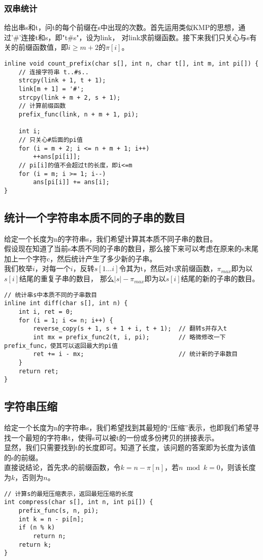         \subsubsection{双串统计}
            给出串s和t，问t的每个前缀在s中出现的次数。首先运用类似KMP的思想，通过'\#'连接t和s，即"t\#s"，设为link，
            对link求前缀函数。接下来我们只关心与s有关的前缀函数值，即$i \ge m+2$的$\pi[i]$。
            \begin{lstlisting}
inline void count_prefix(char s[], int n, char t[], int m, int pi[]) {
    // 连接字符串 t..#s..
    strcpy(link + 1, t + 1);
    link[m + 1] = '#';
    strcpy(link + m + 2, s + 1);
    // 计算前缀函数
    prefix_func(link, n + m + 1, pi);

    int i;
    // 只关心#后面的pi值
    for (i = m + 2; i <= n + m + 1; i++)
        ++ans[pi[i]];
    // pi[i]的值不会超过t的长度，即i<=m
    for (i = m; i >= 1; i--)
        ans[pi[i]] += ans[i];
}
            \end{lstlisting}
    \subsection{统计一个字符串本质不同的子串的数目}
        给定一个长度为n的字符串s，我们希望计算其本质不同子串的数目。\\
        假设现在知道了当前s本质不同的子串的数目，那么接下来可以考虑在原来的s末尾加上一个字符c，然后统计产生了多少新的子串。\\
        我们枚举$i$，对每一个$i$，反转$s[1 \dots i]$令其为t，然后对t求前缀函数，$\pi_{max}$即为以$s[i]$结尾的重复子串的数目，
        那么$|s|-\pi_{max}$即为以$s[i]$结尾的新的子串的数目。
        \begin{lstlisting}
// 统计串s中本质不同的子串数目
inline int diff(char s[], int n) {
    int i, ret = 0;
    for (i = 1; i <= n; i++) {
        reverse_copy(s + 1, s + 1 + i, t + 1);  // 翻转s并存入t
        int mx = prefix_func2(t, i, pi);        // 略微修改一下prefix_func，使其可以返回最大的pi值
        ret += i - mx;                          // 统计新的子串数目
    }
    return ret;
}
        \end{lstlisting}
    \subsection{字符串压缩}
        给定一个长度为n的字符串s，我们希望找到其最短的“压缩”表示，也即我们希望寻找一个最短的字符串t，使得s可以被t的一份或多份拷贝的拼接表示。\\
        显然，我们只需要找到t的长度即可。知道了长度，该问题的答案即为长度为该值的s的前缀。\\
        直接说结论，首先求s的前缀函数，令$k=n-\pi[n]$，若$n \bmod k = 0$，则该长度为$k$，否则为$n$。
        \begin{lstlisting}
// 计算s的最短压缩表示，返回最短压缩的长度
int compress(char s[], int n, int pi[]) {
    prefix_func(s, n, pi);
    int k = n - pi[n];
    if (n % k)
        return n;
    return k;
}
        \end{lstlisting}
